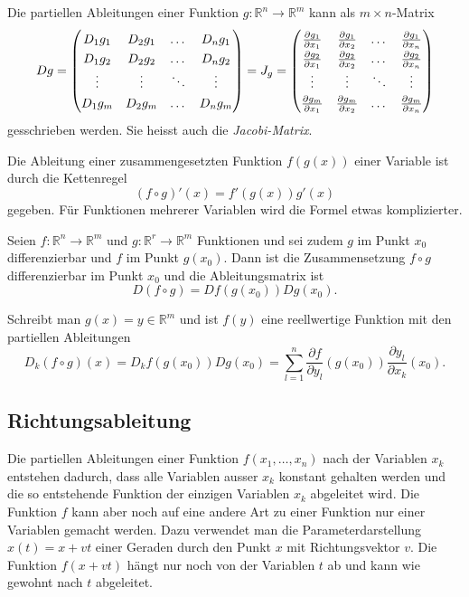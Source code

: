\begin{definition}
\label{buch:richtungsableitung:def:ableitungsmatrix}
Die partiellen Ableitungen einer Funktion
$g\colon\mathbb{R}^n\to\mathbb{R}^m$
kann als $m\times n$-Matrix
\[
Dg
=
\begin{pmatrix}
D_1g_1 & D_2g_1 & \dots  & D_ng_1 \\
D_1g_2 & D_2g_2 & \dots  & D_ng_2 \\
\vdots & \vdots & \ddots & \vdots \\
D_1g_m & D_2g_m & \dots  & D_ng_m
\end{pmatrix}
=
J_g
=
{\renewcommand{\arraystretch}{1.3}
\begin{pmatrix}
\frac{\partial g_1}{\partial x_1}
	& \frac{\partial g_1}{\partial x_2}
		&\dots
			&\frac{\partial g_1}{\partial x_n}
\\
\frac{\partial g_2}{\partial x_1}
	& \frac{\partial g_2}{\partial x_2}
		&\dots
			&\frac{\partial g_2}{\partial x_n}
\\
\vdots	&\vdots	&\ddots	&\vdots \\
\frac{\partial g_m}{\partial x_1}
	& \frac{\partial g_m}{\partial x_2}
		&\dots
			&\frac{\partial g_m}{\partial x_n}
\end{pmatrix}}
\]
gesschrieben werden.
Sie heisst auch die {\em Jacobi-Matrix}.
%
\end{definition}

Die Ableitung einer zusammengesetzten Funktion $f(g(x))$ einer 
Variable ist durch die Kettenregel
\[
(f\circ g)'(x)
=
f'(g(x)) g'(x)
\]
gegeben.
Für Funktionen mehrerer Variablen wird die Formel etwas komplizierter.

\begin{satz}
Seien $f\colon \mathbb{R}^n\to\mathbb{R}^m$ und
$g\colon\mathbb{R}^r\to\mathbb{R}^m$ Funktionen und sei zudem
$g$ im Punkt $x_0$ differenzierbar und $f$ im Punkt $g(x_0)$.
Dann ist die Zusammensetzung $f\circ g$ differenzierbar im Punkt $x_0$
und die Ableitungsmatrix ist
\[
D(f\circ g) = Df(g(x_0)) Dg(x_0).
\]
\end{satz}

Schreibt man $g(x)=y\in\mathbb{R}^m$ und ist $f(y)$ eine reellwertige Funktion
mit den partiellen Ableitungen
\[
D_k(f\circ g)(x)
=
D_kf(g(x_0)) Dg(x_0)
=
\sum_{l=1}^n
\frac{\partial f}{\partial y_l}(g(x_0))
\frac{\partial y_l}{\partial x_k}(x_0).
\]


%
%
\subsection{Richtungsableitung}
Die partiellen Ableitungen einer Funktion $f(x_1,\dots,x_n)$
nach der Variablen $x_k$ entstehen dadurch, dass alle Variablen
ausser $x_k$ konstant gehalten werden und die so entstehende
Funktion der einzigen Variablen $x_k$ abgeleitet wird.
Die Funktion $f$ kann aber noch auf eine andere Art zu einer
Funktion nur einer Variablen gemacht werden.
Dazu verwendet man die Parameterdarstellung $x(t) = x + vt$ einer
Geraden durch den Punkt $x$ mit Richtungsvektor $v$.
Die Funktion $f(x+vt)$ hängt nur noch von der Variablen $t$ ab
und kann wie gewohnt nach $t$ abgeleitet.

